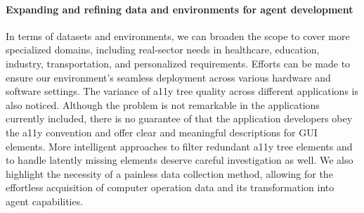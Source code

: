\paragraph{Expanding and refining data and environments for agent development}
In terms of datasets and environments, we can broaden the scope to cover more specialized domains, including real-sector needs in healthcare, education, industry, transportation, and personalized requirements. 
Efforts can be made to ensure our environment's seamless deployment across various hardware and software settings. 
The variance of a11y tree quality across different applications is also noticed. Although
the problem is not remarkable in the applications currently included, there is no guarantee
of that the application developers obey the a11y convention and offer clear and meaningful 
descriptions for GUI elements. More intelligent approaches to filter redundant a11y tree elements
and to handle latently missing elements deserve careful investigation as well.
We also highlight the necessity of a painless data collection method, allowing for the effortless acquisition of computer operation data and its transformation into agent capabilities.
